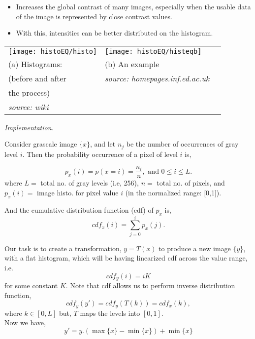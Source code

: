 \documentclass{response}
\begin{document}
{\large 

\begin{itemize}\setlength\itemsep{-0.5em}
\item Increases the global contrast of many images, especially when the usable data of the image is represented by close contrast values.
\item With this, intensities can be better distributed on the histogram.
\end{itemize}


\begin{tabular}{lll}
\texttt{[image: histoEQ/histo]} & \texttt{[image: histoEQ/histeqb]} \\
(a) Histograms:  &(b) An example\\
(before and after & \textit{source: homepages.inf.ed.ac.uk}\\
the process) \\
\textit{source: wiki}
\end{tabular}

\newpage

\bigskip

{\huge \em Implementation.} 
\bigskip

Consider grascale image $\{x\}$, and let $n_j$ be the number of occurrences of gray level $i$. Then the probability occurrence of a pixel of level $i$ is,

\[
p_x(i) = p(x=i) = \frac{n_i}{n}, \mbox{ and } 0\leq i \leq L.
\]
where $L=$ total no. of gray levels (i.e, 256), $n=$ total no. of pixels, and $p_x(i) =$ image histo. for pixel value $i$ (in the normalized range: [0,1]). 
 
And the cumulative distribution function (cdf) of $p_x$ is,
\[
cdf_x(i) = \sum_{j=0}^ip_x(j).
\] 


\newpage

\bigskip

Our task is to create a transformation, $y = T(x)$ to produce a new image $\{y\}$, with a flat histogram, which will be having linearized cdf across the value range, i.e.
\[
cdf_y(i) = iK
\]
for some constant $K$. Note that cdf allows us to perform inverse distribution function, 
\[
cdf_y(y') = cdf_y(T(k)) = cdf_x(k),
\] 
where $k\in [0, L]$ but, $T$ maps the levels into $[0,1].$  \\
Now we have, 
\[
y' = y.(\max\{ x\} - \min\{ x\}) + \min\{ x\}
\]




\newpage

\bigskip

}
\end{document}
